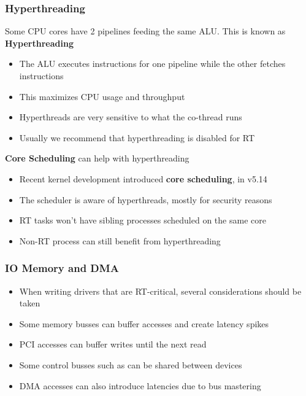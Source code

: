 \begin{frame}
        \frametitle{Hyperthreading}
        Some CPU cores have 2 pipelines feeding the same ALU. This is known as \textbf{Hyperthreading}
        \begin{itemize}
                \item The ALU executes instructions for one pipeline while the other fetches instructions
                \item This maximizes CPU usage and throughput
                \item Hyperthreads are very sensitive to what the co-thread runs
                \item Usually we recommend that hyperthreading is disabled for RT
        \end{itemize}
        \textbf{Core Scheduling} can help with hyperthreading
        \begin{itemize}
                \item Recent kernel development introduced \textbf{core scheduling}, in v5.14
                \item The scheduler is aware of hyperthreads, mostly for security reasons
                \item RT tasks won't have sibling processes scheduled on the same core
                \item Non-RT process can still benefit from hyperthreading
        \end{itemize}
\end{frame}

\begin{frame}
        \frametitle{IO Memory and DMA}
        \begin{itemize}
                \item When writing drivers that are RT-critical, several considerations should be taken
                \item Some memory busses can buffer accesses and create latency spikes
                \item PCI accesses can buffer writes until the next read
                \item Some control busses such as  can be shared between devices
                \item DMA accesses can also introduce latencies due to bus mastering
        \end{itemize}
\end{frame}

